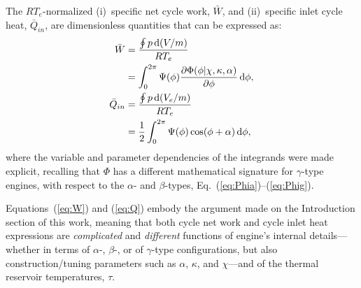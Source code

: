     The $RT_e$-normalized (i)~specific net cycle work, $\bar{W}$, and (ii)~specific inlet  cycle
    heat, $\bar{Q}_{in}$, are dimensionless quantities that can be expressed as:
    \begin{align}
        \label{eq:W}
        \bar{W} &= \frac{\oint p\,\mathrm{d}(V/m)}{RT_e} \nonumber\\
                &= \int_0^{2\pi} \Psi(\phi)
                   \frac{\partial\Phi(\phi | \chi, \kappa, \alpha)}{\partial\phi}\,\mathrm{d}\phi,\\
        \label{eq:Q}
        \bar{Q}_{in} &= \frac{\oint p\,\mathrm{d}(V_e/m)}{RT_e} \nonumber\\
                     &= \frac{1}{2} \int_0^{2\pi} \Psi(\phi)
                        \cos(\phi + \alpha) \,\mathrm{d}\phi,
    \end{align}
    \noindent where the  variable  and  parameter  dependencies  of  the  integrands  were  made
    explicit, recalling that $\Phi$ has a different  mathematical  signature  for  $\gamma$-type
    engines,      with      respect      to      the      $\alpha$-      and      $\beta$-types,
    Eq.~(\ref{eq:Phia})--(\ref{eq:Phig}).

    Equations~(\ref{eq:W}) and (\ref{eq:Q}) embody the argument made on the Introduction section
    of this work, meaning that both  cycle  net  work  and  cycle  inlet  heat  expressions  are
    \emph{complicated} and \emph{different} functions of engine's internal details---whether  in
    terms   of   $\alpha$-,   $\beta$-,   or   of   $\gamma$-type   configurations,   but   also
    construction/tuning parameters such as $\alpha$, $\kappa$, and $\chi$---and of  the  thermal
    reservoir temperatures, $\tau$.


